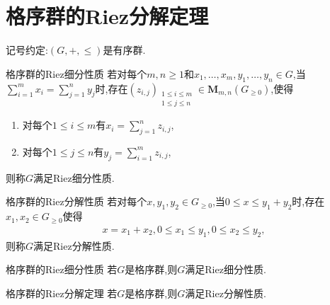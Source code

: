 \section{格序群的Riez分解定理}

记号约定:$\left(G,+,\leq\right)$是有序群.

\begin{definition}{格序群的Riez细分性质}{}
	若对每个$m,n\geq 1$和$x_{1},\ldots,x_{m},y_{1},\ldots,y_{n}\in G$,当$\sum\limits_{i=1}^{m}x_{i}=\sum\limits_{j=1}^{n}y_{j}$时,存在$\left(z_{i,j}\right)_{\substack{1\leq i\leq m\\ 1\leq j\leq n}}\in\mathbf{M}_{m,n}\left(G_{\geq 0}\right)$,使得
	\begin{enumerate}
		\item 对每个$1\leq i\leq m$有$x_{i}=\sum\limits_{j=1}^{n}z_{i,j}$,
		\item 对每个$1\leq j\leq n$有$y_{j}=\sum\limits_{i=1}^{m}z_{i,j}$,
	\end{enumerate}
	则称$G$满足Riez细分性质.
\end{definition}

\begin{definition}{格序群的Riez分解性质}{}
	若对每个$x,y_{1},y_{2}\in G_{\geq 0}$,当$0\leq x\leq y_{1}+y_{2}$时,存在$x_{1},x_{2}\in G_{\geq 0}$使得
	\begin{align*}
		x=x_{1}+x_{2},0\leq x_{1}\leq y_{1},0\leq x_{2}\leq y_{2},
	\end{align*}
	则称$G$满足Riez分解性质.
\end{definition}

\begin{theorem}{格序群的Riez细分性质}{}
	若$G$是格序群,则$G$满足Riez细分性质.
\end{theorem}

\begin{corollary}{格序群的Riez分解定理}{}
	若$G$是格序群,则$G$满足Riez分解性质.
\end{corollary}